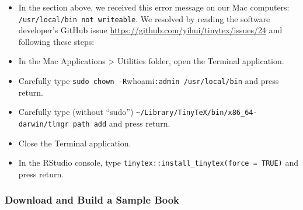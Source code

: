\documentclass[
  english,
]{book}
\providecommand{\tightlist}{%
  \setlength{\itemsep}{0pt}\setlength{\parskip}{0pt}}
\begin{document}
\begin{itemize}
\tightlist
\item
  In the section above, we received this error message on our Mac computers: \texttt{/usr/local/bin\ not\ writeable}. We resolved by reading the software developer's GitHub issue \url{https://github.com/yihui/tinytex/issues/24} and following these steps:
\item
  In the Mac Applications \textgreater{} Utilities folder, open the Terminal application.
\item
  Carefully type \texttt{sudo\ chown\ -R}whoami\texttt{:admin\ /usr/local/bin} and press return.
\item
  Carefully type (without ``sudo'') \texttt{\textasciitilde{}/Library/TinyTeX/bin/x86\_64-darwin/tlmgr\ path\ add} and press return.
\item
  Close the Terminal application.
\item
  In the RStudio console, type \texttt{tinytex::install\_tinytex(force\ =\ TRUE)} and press return.
\end{itemize}

\hypertarget{download-and-build-a-sample-book}{%
\subsubsection*{Download and Build a Sample Book}\label{download-and-build-a-sample-book}}
\end{document}

